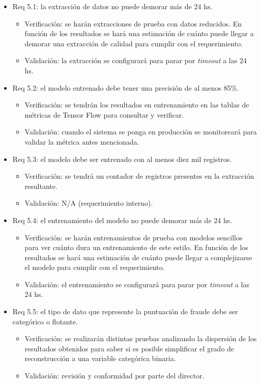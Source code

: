 \documentclass[
11pt, %
]{charter}
\begin{document}
\begin{itemize}
\item Req 5.1: la extracción de datos no puede demorar más de 24 hs.
\begin{itemize}
	\item Verificación: se harán extracciones de prueba con datos reducidos. En función de los resultados se hará una estimación de cuánto puede llegar a demorar una extracción de calidad para cumplir con el requerimiento.
	\item Validación: la extracción se configurará para parar por \emph{timeout} a las 24 hs.
\end{itemize}

\item Req 5.2: el modelo entrenado debe tener una precisión de al menos 85\%.
\begin{itemize}
	\item Verificación: se tendrán los resultados en entrenamiento en las tablas de métricas de Tensor Flow para consultar y verificar.
	\item Validación: cuando el sistema se ponga en producción se monitoreará para validar la métrica antes mencionada.
\end{itemize}

\item Req 5.3: el modelo debe ser entrenado con al menos diez mil registros.
\begin{itemize}
	\item Verificación: se tendrá un contador de registros presentes en la extracción resultante.
	\item Validación: N/A (requerimiento interno).
\end{itemize}

\item Req 5.4: el entrenamiento del modelo no puede demorar más de 24 hs.
\begin{itemize}
	\item Verificación: se harán entrenamientos de prueba con modelos sencillos para ver cuánto dura un entrenamiento de este estilo. En función de los resultados se hará una estimación de cuánto puede llegar a complejizarse el modelo para cumplir con el requerimiento.
	\item Validación: el entrenamiento se configurará para parar por \emph{timeout} a las 24 hs.
\end{itemize}

\item Req 5.5: el tipo de dato que represente la puntuación de fraude debe ser categórico o flotante.
\begin{itemize}
	\item Verificación: se realizarán distintas pruebas analizando la dispersión de los resultados obtenidos para saber si es posible simplificar el grado de reconstrucción a una variable categórica binaria.
	\item Validación: revisión y conformidad por parte del director.
\end{itemize}


\end{itemize}
\end{document}
